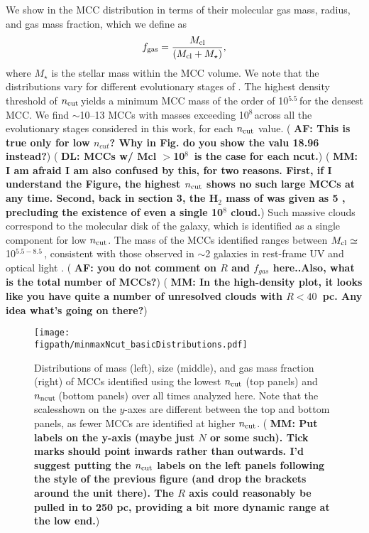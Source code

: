 \IfFileExists{emulateapjlegacy.cls}{\documentclass[iop]{emulateapjlegacy}}{\documentclass[iop]{emulateapj}}
\newcommand{\DL}[1]{({\bf \color{dlcolor} DL: #1})}
\newcommand{\AF}[1]{({\bf \color{afcolor} AF: #1})}
\newcommand{\MM}[1]{({\bf \color{mmcolor} MM: #1})}
\def\figpath{./Fig}
\begin{document}
We show in  the MCC distribution in terms of their molecular gas mass, radius, and gas mass fraction, which we define as
\begin{equation}
f_{\rm gas} = \frac{M_{\rm cl}} {\left(M_{\rm cl} + M_\star\right)},
\end{equation}
where $M_\star$ is the stellar mass within the MCC volume.
%
We note that the distributions vary for different evolutionary stages of \flower. The highest density threshold of $n_{\rm cut}$\,\cc yields a minimum MCC mass of the order of 10$^{5.5}$\,\Msun for the densest MCC.
%
We find $\sim$10--13 MCCs with masses exceeding 10$^8$\,\Msun across
all the evolutionary stages considered in this work, for each  $n_{\rm
  cut}$ value. \AF{This is true only for low $n_{cut}$? Why in Fig. do
  you show the valu 18.96 instead?} \DL{MCCs w/ Mcl $>$10$^8$\,\Msun
  is the case for each ncut.} \MM{I am afraid I am also confused by
  this, for two reasons.  First, if I understand the Figure, the
  highest $n_{\rm cut}$ shows no such large MCCs at any time.  Second,
  back in section 3, the H$_2$ mass of \flower was given as 5\E7
  \Msun, precluding the existence of even a single 10$^8$ \Msun
  cloud.} Such massive clouds correspond to the molecular disk of the
galaxy, which is identified as a single component for low $n_{\rm
  cut}$. The mass of the MCCs identified ranges between $M_{\rm
  cl}\simeq$10$^{5.5-8.5}$\,\Msun, consistent with those observed in
\z$\sim$2 galaxies in rest-frame UV and optical light
\citep{Elmegreen07a, Elmegreen09a}. \AF{you do not comment on $R$ and
  $f_{gas}$ here..Also, what is the total number of MCCs?} \MM{In the
  high-density plot, it looks like you have quite a number of
  unresolved clouds with $R < 40$~pc. Any idea what's going on there?}

\begin{figure*}[htbp]
\centering
\texttt{[image: \\figpath/minmaxNcut\_basicDistributions.pdf]}
\caption{Distributions of mass (left), size (middle), and gas mass
  fraction (right) of MCCs identified using the lowest $n_{\rm cut}$
  (top panels) and $n_{\rm ncut}$\,\cc (bottom panels)
      over all times analyzed here.
Note that the scalesshown on the $y$-axes are different between the top
and bottom panels, as fewer MCCs are identified at higher $n_{\rm
  cut}$. \MM{Put labels on the y-axis (maybe just $N$ or some such). Tick marks should point inwards
  rather than outwards.  I'd suggest putting the $n_{\rm cut}$ labels
  on the left panels following the style of the previous figure (and
  drop the brackets around the unit there). The $R$ axis could
  reasonably be pulled in to 250 pc, providing a bit more dynamic
  range at the low end.}
\label{fig:dist}}
\end{figure*}
\end{document}
